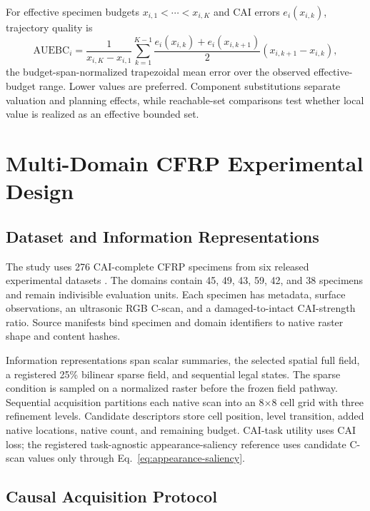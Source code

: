 \documentclass[preprint,12pt]{elsarticle}
\newcommand{\auebc}{\mathrm{AUEBC}}
\begin{document}
For effective specimen budgets $x_{i,1}<\cdots<x_{i,K}$ and CAI errors
$e_i(x_{i,k})$, trajectory quality is
\begin{equation}
  \auebc_i=\frac{1}{x_{i,K}-x_{i,1}}
  \sum_{k=1}^{K-1}
  \frac{e_i(x_{i,k})+e_i(x_{i,k+1})}{2}
  (x_{i,k+1}-x_{i,k}),
  \label{eq:auebc}
\end{equation}
the budget-span-normalized trapezoidal mean error over the observed
effective-budget range. Lower values are preferred. Component substitutions
separate valuation and planning effects, while reachable-set comparisons test
whether local value is realized as an effective bounded set.

\section{Multi-Domain CFRP Experimental Design}
\label{sec:case-study}

\subsection{Dataset and Information Representations}
\label{sec:dataset-representations}

The study uses 276 CAI-complete CFRP specimens from six released experimental
datasets \cite{hasebe2022dataset,hasebe2025caidataset}. The domains contain
45, 49, 43, 59, 42, and 38 specimens and remain indivisible evaluation units.
Each specimen has metadata, surface observations, an ultrasonic RGB C-scan,
and a damaged-to-intact CAI-strength ratio. Source manifests bind specimen and
domain identifiers to native raster shape and content hashes.

Information representations span scalar summaries, the selected spatial full
field, a registered 25\% bilinear sparse field, and sequential legal states.
The sparse condition is sampled on a normalized raster before the frozen field
pathway. Sequential acquisition partitions each native scan into an
8$\times$8 cell grid with three refinement levels. Candidate descriptors store
cell position, level transition, added native locations, native count, and
remaining budget. CAI-task utility uses CAI loss; the registered task-agnostic
appearance-saliency reference uses candidate C-scan values only through
Eq.~\eqref{eq:appearance-saliency}.



\subsection{Causal Acquisition Protocol}
\label{sec:causal-protocol}
\end{document}
